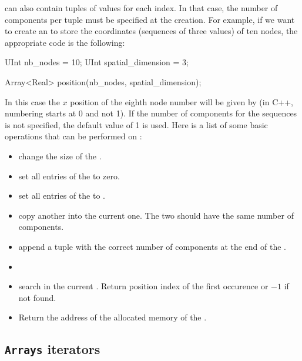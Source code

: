  can also contain tuples of values for each index. In
that case, the number of components per tuple must be specified at the
 creation.  For example, if we want to create an
 to store the coordinates (sequences of three values) of
ten nodes, the appropriate code is the following:
\begin{cpp}
  UInt nb_nodes = 10;
  UInt spatial_dimension = 3;

  Array<Real> position(nb_nodes, spatial_dimension);
\end{cpp}
In this case the $x$ position of the eighth node number will be given by
 (in C++, numbering starts at 0 and not
1). If the number of components for the sequences is not specified, the
default value of 1 is used.
Here is a list of some basic operations that can be performed on :
\begin{itemize}
  \item {} change the size of the .
  \item {} set all entries of the  to zero.
  \item {} set all entries of the  to .
  \item {} copy another  into the current one. The two  should have the same number of components.
  \item {} append a tuple with the correct number of components at the end of the .
  \item {}
  \item {} search  in the current . Return position index of the first occurence or $-1$ if not found.
  \item {} Return the address of the allocated memory of the . 
\end{itemize}

\subsection{\texttt{Arrays} iterators}

